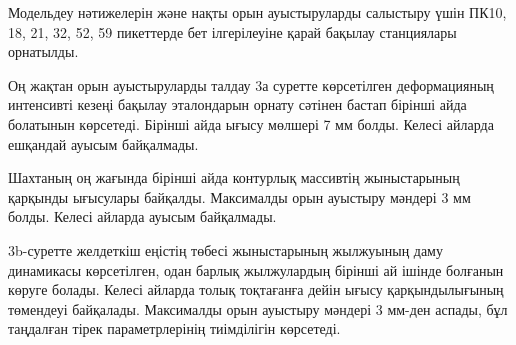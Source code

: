 \begin{multicols}{2}
Модельдеу нәтижелерін және нақты орын ауыстыруларды салыстыру үшін ПК10,
18, 21, 32, 52, 59 пикеттерде бет ілгерілеуіне қарай бақылау станциялары
орнатылды.

Оң жақтан орын ауыстыруларды талдау 3а суретте көрсетілген деформацияның
интенсивті кезеңі бақылау эталондарын орнату сәтінен бастап бірінші айда
болатынын көрсетеді. Бірінші айда ығысу мөлшері 7 мм болды. Келесі
айларда ешқандай ауысым байқалмады.

Шахтаның оң жағында бірінші айда контурлық массивтің жыныстарының
қарқынды ығысулары байқалды. Максималды орын ауыстыру мәндері 3 мм
болды. Келесі айларда ауысым байқалмады.

3b-суретте желдеткіш еңістің төбесі жыныстарының жылжуының даму
динамикасы көрсетілген, одан барлық жылжулардың бірінші ай ішінде
болғанын көруге болады. Келесі айларда толық тоқтағанға дейін ығысу
қарқындылығының төмендеуі байқалады. Максималды орын ауыстыру мәндері 3
мм-ден аспады, бұл таңдалған тірек параметрлерінің тиімділігін
көрсетеді.
\end{multicols}

